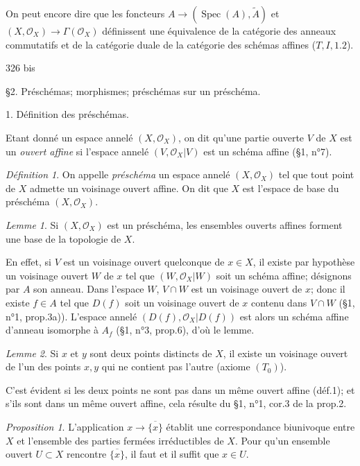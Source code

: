 On peut encore dire que les foncteurs $A \to (\operatorname{Spec}(A), \tilde{A})$ et $(X, \mathcal{O}_X) \to \Gamma(\mathcal{O}_X)$ définissent une équivalence de la catégorie des anneaux commutatifs et de la catégorie duale de la catégorie des schémas affines ($T, I, 1.2$).

\newpage


 \hfill 326 bis

§2. Préschémas; morphismes; préschémas sur un préschéma.

1. Définition des préschémas.

Etant donné un espace annelé $(X, \mathcal{O}_X)$, on dit qu'une partie ouverte $V$ de $X$ est un \emph{ouvert affine} si l'espace annelé $(V, \mathcal{O}_X|V)$ est un schéma affine (§1, n°7).

\emph{Définition 1}. On appelle \emph{préschéma} un espace annelé $(X, \mathcal{O}_X)$ tel que tout point de $X$ admette un voisinage ouvert affine. On dit que $X$ est l'espace de base du préschéma $(X, \mathcal{O}_X)$.

\emph{Lemme 1}. Si $(X, \mathcal{O}_X)$ est un préschéma, les ensembles ouverts affines forment une base de la topologie de $X$.

En effet, si $V$ est un voisinage ouvert quelconque de $x \in X$, il existe par hypothèse un voisinage ouvert $W$ de $x$ tel que $(W, \mathcal{O}_X|W)$ soit un schéma affine; désignons par $A$ son anneau. Dans l'espace $W$, $V \cap W$ est un voisinage ouvert de $x$; donc il existe $f \in A$ tel que $D(f)$ soit un voisinage ouvert de $x$ contenu dans $V \cap W$ (§1, n°1, prop.3a)). L'espace annelé $(D(f), \mathcal{O}_X|D(f))$ est alors un schéma affine d'anneau isomorphe à $A_f$ (§1, n°3, prop.6), d'où le lemme.

\emph{Lemme 2}. Si $x$ et $y$ sont deux points distincts de $X$, il existe un voisinage ouvert de l'un des points $x, y$ qui ne contient pas l'autre (axiome $(T_0)$).

C'est évident si les deux points ne sont pas dans un même ouvert affine (déf.1); et s'ils sont dans un même ouvert affine, cela résulte du §1, n°1, cor.3 de la prop.2.

\emph{Proposition 1}. L'application $x \to \overline{\{x\}}$ établit une correspondance biunivoque entre $X$ et l'ensemble des parties fermées irréductibles de $X$. Pour qu'un ensemble ouvert $U \subset X$ rencontre $\overline{\{x\}}$, il faut et il suffit que $x \in U$.

